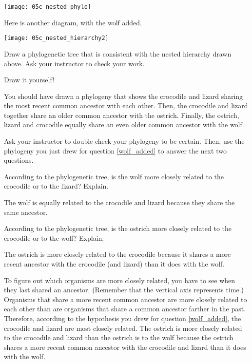 \documentclass[12pt, hidelinks]{exam}
\newcommand*\AnswerBox[2]{%
    \parbox[t][#1]{0.92\textwidth}{%
    \begin{solution}#2\end{solution}}
    \vspace{\stretch{1}}
}
\begin{document}
\begin{center}
	\noindent\texttt{[image: 05c\_nested\_phylo]}
\end{center}


Here is another diagram, with the wolf added.


\begin{center}
	\noindent\texttt{[image: 05c\_nested\_hierarchy2]}
\end{center}

\newpage

\begin{questions}
\setcounter{question}{4}

\question\label{wolf_added}
Draw a phylogenetic tree that is consistent with the nested
hierarchy drawn above. Ask your instructor to check your work.

\AnswerBox{10\baselineskip}{Draw it yourself!}

\end{questions}

You should have drawn a phylogeny that shows the crocodile and lizard
sharing the most recent common ancestor with each other. Then, the
crocodile and lizard together share an older common ancestor with the
ostrich. Finally, the ostrich, lizard and crocodile equally share an
even older common ancestor with the wolf.

Ask your instructor to double-check your phylogeny to be certain. Then, use the
phylogeny you just drew for question \ref{wolf_added} to answer the next two
questions.

\begin{questions}
\setcounter{question}{5}

\question
According to the phylogenetic tree, is the wolf more closely
related to the crocodile or to the lizard? Explain.

\AnswerBox{3\baselineskip}{The wolf is equally related to the crocodile and
lizard because they share the same ancestor.}

\question
According to the phylogenetic tree, is the ostrich more
closely related to the crocodile or to the wolf? Explain.

\AnswerBox{3\baselineskip}{The ostrich is more closely related to the 
crocodile because it shares a more recent ancestor with the crocodile (and lizard)
than it does with the wolf.}

\end{questions}

To figure out which organisms are more closely related, you have to see
when they last shared an ancestor. (Remember that the vertical axis
represents time.) Organisms that share a more recent common ancestor are
more closely related to each other than are organisms that share a
common ancestor farther in the past. Therefore, according to the
hypothesis you drew for question \ref{wolf_added}, the crocodile and lizard are most
closely related. The ostrich is more closely related to the crocodile
and lizard than the ostrich is to the wolf because the ostrich shares a
more recent common ancestor with the crocodile and lizard than it does
with the wolf.
\end{document}
